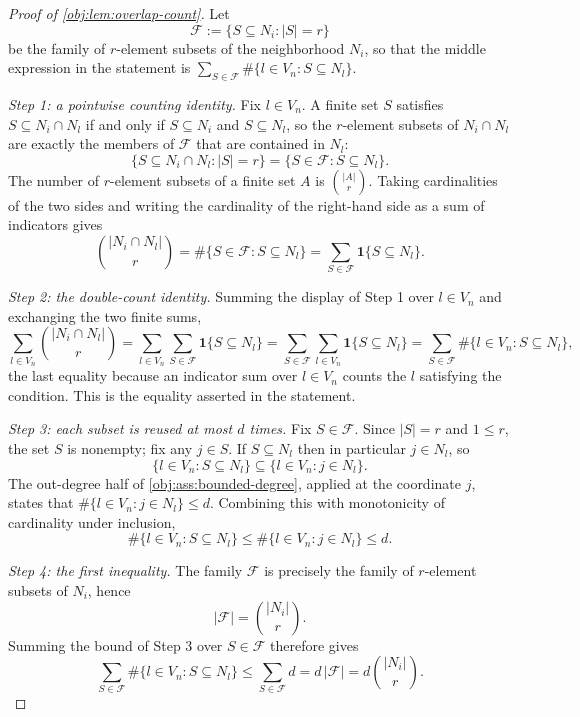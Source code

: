 \documentclass[11pt]{article}
\begin{document}
\begin{proof}[Proof of \cref{obj:lem:overlap-count}]
Let
\[
\mathcal F:=\{S\subseteq N_i:|S|=r\}
\]
be the family of \(r\)-element subsets of the neighborhood \(N_i\), so that the middle expression in the statement is \(\sum_{S\in\mathcal F}\#\{l\in V_n:S\subseteq N_l\}\).

\emph{Step 1: a pointwise counting identity.}  Fix \(l\in V_n\).  A finite set \(S\) satisfies \(S\subseteq N_i\cap N_l\) if and only if \(S\subseteq N_i\) and \(S\subseteq N_l\), so the \(r\)-element subsets of \(N_i\cap N_l\) are exactly the members of \(\mathcal F\) that are contained in \(N_l\):
\[
\{S\subseteq N_i\cap N_l:|S|=r\}
=
\{S\in\mathcal F:S\subseteq N_l\}.
\]
The number of \(r\)-element subsets of a finite set \(A\) is \(\binom{|A|}{r}\).  Taking cardinalities of the two sides and writing the cardinality of the right-hand side as a sum of indicators gives
\[
\binom{|N_i\cap N_l|}{r}
=
\#\{S\in\mathcal F:S\subseteq N_l\}
=
\sum_{S\in\mathcal F}\mathbf 1\{S\subseteq N_l\}.
\]

\emph{Step 2: the double-count identity.}  Summing the display of Step 1 over \(l\in V_n\) and exchanging the two finite sums,
\[
\sum_{l\in V_n}\binom{|N_i\cap N_l|}{r}
=
\sum_{l\in V_n}\sum_{S\in\mathcal F}\mathbf 1\{S\subseteq N_l\}
=
\sum_{S\in\mathcal F}\sum_{l\in V_n}\mathbf 1\{S\subseteq N_l\}
=
\sum_{S\in\mathcal F}\#\{l\in V_n:S\subseteq N_l\},
\]
the last equality because an indicator sum over \(l\in V_n\) counts the \(l\) satisfying the condition.  This is the equality asserted in the statement.

\emph{Step 3: each subset is reused at most \(d\) times.}  Fix \(S\in\mathcal F\).  Since \(|S|=r\) and \(1\le r\), the set \(S\) is nonempty; fix any \(j\in S\).  If \(S\subseteq N_l\) then in particular \(j\in N_l\), so
\[
\{l\in V_n:S\subseteq N_l\}\subseteq\{l\in V_n:j\in N_l\}.
\]
The out-degree half of \cref{obj:ass:bounded-degree}, applied at the coordinate \(j\), states that \(\#\{l\in V_n:j\in N_l\}\le d\).  Combining this with monotonicity of cardinality under inclusion,
\[
\#\{l\in V_n:S\subseteq N_l\}
\le
\#\{l\in V_n:j\in N_l\}
\le
d .
\]

\emph{Step 4: the first inequality.}  The family \(\mathcal F\) is precisely the family of \(r\)-element subsets of \(N_i\), hence
\[
|\mathcal F|=\binom{|N_i|}{r}.
\]
Summing the bound of Step 3 over \(S\in\mathcal F\) therefore gives
\[
\sum_{S\in\mathcal F}\#\{l\in V_n:S\subseteq N_l\}
\le
\sum_{S\in\mathcal F}d
=
d\,|\mathcal F|
=
d\binom{|N_i|}{r}.
\]


\end{proof}
\end{document}
